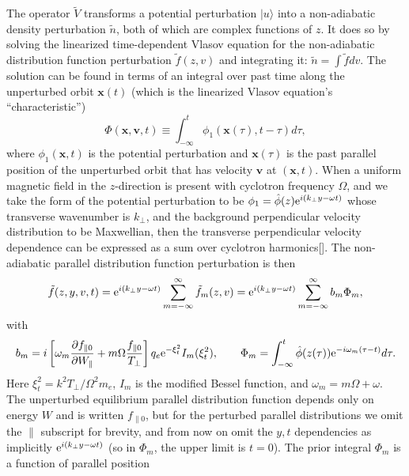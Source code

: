 \documentclass[12pt]{article}
\def\ket#1{|#1\rangle}
\def\etothe#1{{\rm e}^{#1}}
\begin{document}
The operator $\tilde{V}$ transforms a potential perturbation $\ket{u}$
into a non-adiabatic density perturbation $\tilde n$, both of which
are complex functions of $z$. It does so by solving the linearized
time-dependent Vlasov equation for the non-adiabatic distribution
function perturbation $\tilde f(z,v)$ and integrating it:
$\tilde n =\int \tilde f dv$. The solution can be found in terms
of an integral over past time along the unperturbed orbit $\bm x(t)$
(which is the linearized Vlasov equation's ``characteristic'')
\begin{equation}
  \label{eq:phim}
  \Phi(\bm x,\bm v,t)\equiv 
  \int_{-\infty}^t \phi_1(\bm x(\tau),t-\tau ) d\tau,
\end{equation}
where $\phi_1(\bm x,t)$ is the potential perturbation and
$\bm x(\tau)$ is the past parallel position of the unperturbed orbit
that has velocity $\bm v$ at $(\bm x,t)$.  When a uniform magnetic
field in the $z$-direction is present with cyclotron frequency
$\Omega$, and we take the form of the potential perturbation to be
$\phi_1=\hat\phi(z){\rm e}^{i(k_\perp y-\omega t)}$ whose transverse
wavenumber is $k_\perp$, and the background perpendicular velocity
distribution to be Maxwellian, then the transverse perpendicular velocity
dependence can be expressed as a sum over cyclotron harmonics[].
The non-adiabatic parallel distribution function perturbation is then
\begin{equation}\label{eq:ftmagnetic}
    \tilde f(z,y,v,t) = {\rm e}^{i(k_\perp y-\omega t)}
    \sum_{m=-\infty}^\infty \tilde f_m(z,v)= {\rm e}^{i(k_\perp
      y-\omega t)} \sum_{m=-\infty}^\infty b_m \Phi_m,
\end{equation}
with
\begin{equation}
  \label{mweight}
   b_m=i\left[\omega_m
  {\partial f_{\parallel0}\over \partial W_\parallel}
  +m\Omega {f_{\parallel0}\over T_\perp}\right]
q_e{\rm e}^{-\xi_t^2}I_m(\xi_t^2),\qquad
\Phi_m=\int_{-\infty}^t \hat\phi(z(\tau))\etothe{-i\omega_m(\tau-t)}d\tau.
\end{equation}
Here $\xi_t^2=k^2T_\perp/\Omega^2m_e$, $I_m$ is the modified Bessel
function, and $\omega_m=m\Omega+\omega$. The unperturbed equilibrium
parallel distribution function depends only on energy $W$ and is
written $f_{\parallel 0}$, but for the perturbed parallel
distributions we omit the $\parallel$ subscript for brevity, and from
now on omit the $y,t$ dependencies as implicitly
$ {\rm e}^{i(k_\perp y-\omega t)}$ (so in $\Phi_m$, the upper limit is
$t=0$). The prior integral $\Phi_m$ is a function of parallel position
\end{document}
